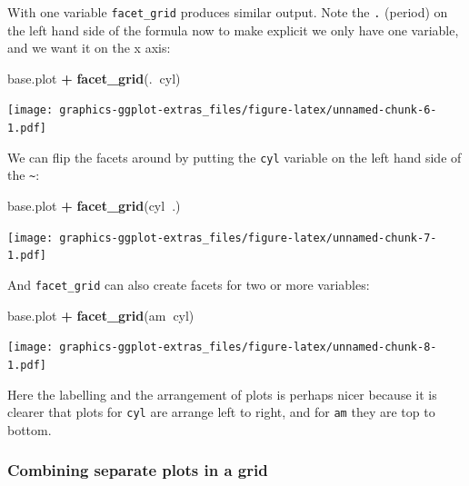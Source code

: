 \documentclass[]{article}
\newenvironment{Shaded}{\begin{snugshade}}{\end{snugshade}}
\newcommand{\KeywordTok}[1]{\textcolor[rgb]{0.13,0.29,0.53}{\textbf{#1}}}
\newcommand{\StringTok}[1]{\textcolor[rgb]{0.31,0.60,0.02}{#1}}
\newcommand{\OperatorTok}[1]{\textcolor[rgb]{0.81,0.36,0.00}{\textbf{#1}}}
\newcommand{\NormalTok}[1]{#1}
\theoremstyle{definition}
\theoremstyle{definition}
\theoremstyle{definition}
\theoremstyle{remark}
\begin{document}
With one variable \texttt{facet\_grid} produces similar output. Note the
\texttt{.} (period) on the left hand side of the formula now to make
explicit we only have one variable, and we want it on the x axis:

\begin{Shaded}
\begin{Highlighting}[]
\NormalTok{base.plot }\OperatorTok{+}\StringTok{ }\KeywordTok{facet_grid}\NormalTok{(.}\OperatorTok{~}\NormalTok{cyl)}
\end{Highlighting}
\end{Shaded}

\texttt{[image: graphics-ggplot-extras\_files/figure-latex/unnamed-chunk-6-1.pdf]}

We can flip the facets around by putting the \texttt{cyl} variable on
the left hand side of the \texttt{\textasciitilde{}}:

\begin{Shaded}
\begin{Highlighting}[]
\NormalTok{base.plot }\OperatorTok{+}\StringTok{ }\KeywordTok{facet_grid}\NormalTok{(cyl}\OperatorTok{~}\NormalTok{.)}
\end{Highlighting}
\end{Shaded}

\texttt{[image: graphics-ggplot-extras\_files/figure-latex/unnamed-chunk-7-1.pdf]}

And \texttt{facet\_grid} can also create facets for two or more
variables:

\begin{Shaded}
\begin{Highlighting}[]
\NormalTok{base.plot }\OperatorTok{+}\StringTok{ }\KeywordTok{facet_grid}\NormalTok{(am}\OperatorTok{~}\NormalTok{cyl)}
\end{Highlighting}
\end{Shaded}

\texttt{[image: graphics-ggplot-extras\_files/figure-latex/unnamed-chunk-8-1.pdf]}

Here the labelling and the arrangement of plots is perhaps nicer because
it is clearer that plots for \texttt{cyl} are arrange left to right, and
for \texttt{am} they are top to bottom.

\subsubsection*{Combining separate plots in a
grid}\label{combining-plots}
\end{document}
